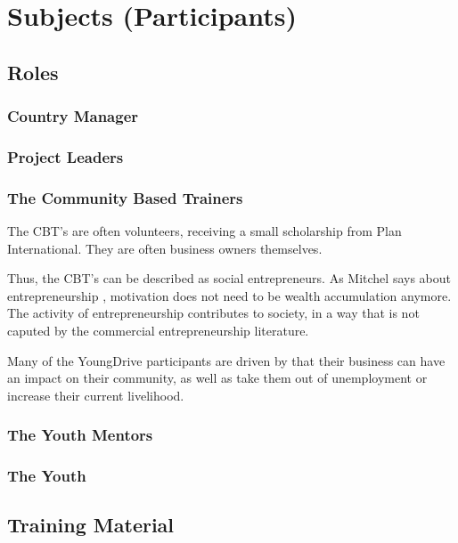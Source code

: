 \section{Subjects (Participants)}

\subsection{Roles}

\subsubsection{Country Manager}

\subsubsection{Project Leaders}

\subsubsection{The Community Based Trainers}

The CBT's are often volunteers, receiving a small scholarship from Plan International. They are often business owners themselves.

Thus, the CBT's can be described as social entrepreneurs. As Mitchel says about entrepreneurship \cite{mitchel}, motivation does not need to be wealth accumulation anymore. The activity of entrepreneurship contributes to society, in a way that is not caputed by the commercial entrepreneurship literature.

Many of the YoungDrive participants are driven by that their business can have an impact on their community, as well as take them out of unemployment or increase their current livelihood.

\subsubsection{The Youth Mentors}


\subsubsection{The Youth}


\subsection{Training Material}

